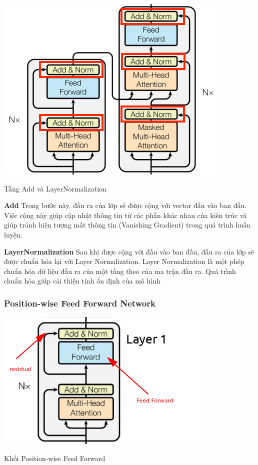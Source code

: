 \documentclass[a4paper, 12pt, openany]{book}
\begin{document}
\begin{minipage}{\linewidth}
    \captionsetup{type=figure}
    \centering
    \includegraphics[width=.8\linewidth]{./assets/images/Add+Norm.png}
    \caption{Tầng Add và LayerNormalization\cite{vaswani2023attention}}
\end{minipage}
\textbf{Add}
Trong bước này, đầu ra của lớp sẽ được cộng với vector
đầu vào ban đầu. Việc cộng này giúp cập nhật thông tin từ các phần khác nhau của kiến
trúc và giúp tránh hiện tượng mất thông tin (Vanishing Gradient) trong quá trình huấn
luyện.

\textbf{LayerNormalization}
Sau khi được cộng với đầu vào ban đầu, đầu ra của lớp sẽ được chuẩn hóa lại với
Layer Normalization. Layer Normalization là một phép chuẩn hóa dữ liệu đầu ra của
một tầng theo của ma trận đầu ra. Quá
trình chuẩn hóa giúp cải thiện tính ổn định của mô hình

\subsubsection{Position-wise Feed Forward Network}
\begin{minipage}{\linewidth}
    \captionsetup{type=figure}
    \centering
    \includegraphics[width=.6\linewidth]{./assets/images/feed-forward-sublayer-in-transformer.png}
    \caption{Khối Position-wise Feed Forward\cite{vaswani2023attention}}
\end{minipage}
\end{document}
